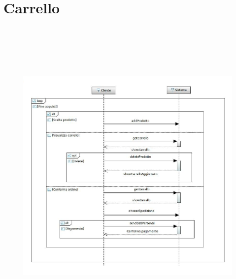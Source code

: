 \documentclass[a4paper,12pt]{report}
\begin{document}
	\section*{Carrello}
	\begin{figure}[h]
		\centering
		\includegraphics[width=\textwidth, height=16cm]{Sequence_Ordine}
	\end{figure}
	
	\newpage
\end{document}
